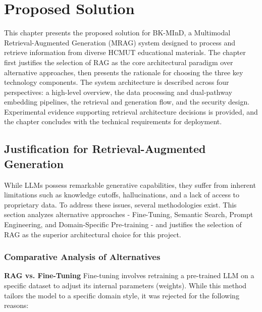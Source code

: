 ﻿\chapter{Proposed Solution}

This chapter presents the proposed solution for BK-MInD, a Multimodal Retrieval-Augmented Generation (MRAG) system designed to process and retrieve information from diverse HCMUT educational materials. The chapter first justifies the selection of RAG as the core architectural paradigm over alternative approaches, then presents the rationale for choosing the three key technology components. The system architecture is described across four perspectives: a high-level overview, the data processing and dual-pathway embedding pipelines, the retrieval and generation flow, and the security design. Experimental evidence supporting retrieval architecture decisions is provided, and the chapter concludes with the technical requirements for deployment.

\section{Justification for Retrieval-Augmented Generation}

While LLMs possess remarkable generative capabilities, they suffer from inherent limitations such as knowledge cutoffs, hallucinations, and a lack of access to proprietary data. To address these issues, several methodologies exist. This section analyzes alternative approaches - Fine-Tuning, Semantic Search, Prompt Engineering, and Domain-Specific Pre-training - and justifies the selection of RAG as the superior architectural choice for this project.

\subsection{Comparative Analysis of Alternatives}

\textbf{RAG vs. Fine-Tuning}
Fine-tuning involves retraining a pre-trained LLM on a specific dataset to adjust its internal parameters (weights). While this method tailors the model to a specific domain style, it was rejected for the following reasons:

